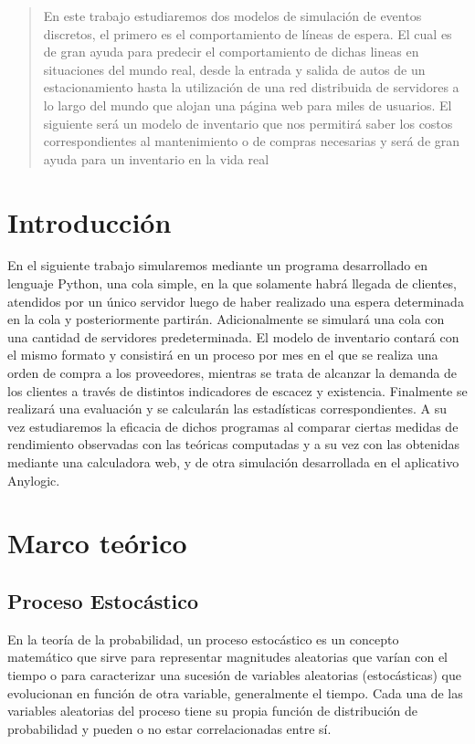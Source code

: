 \begin{abstract}
  En este trabajo estudiaremos dos modelos de simulación de eventos discretos, el primero es el comportamiento
  de líneas de espera. El cual es de gran ayuda para predecir el comportamiento de dichas lineas en
  situaciones del mundo real, desde la entrada y salida de autos de un estacionamiento hasta la utilización
  de una red distribuida de servidores a lo largo del mundo que alojan una página web para miles de usuarios.
  El siguiente será un modelo de inventario que nos permitirá saber los costos correspondientes al mantenimiento
  o de compras necesarias y será de gran ayuda para un inventario en la vida real
\end{abstract}


\section{Introducción}\label{sec:introduccion}
En el siguiente trabajo simularemos mediante un programa desarrollado en lenguaje Python, una cola simple, en la que
solamente habrá llegada de clientes, atendidos por un único servidor luego de haber realizado una espera
determinada en la cola y posteriormente partirán.
Adicionalmente se simulará una cola con una cantidad de servidores predeterminada.
El modelo de inventario contará con el mismo formato y consistirá en un proceso por mes en el que se realiza una orden de compra
a los proveedores, mientras se trata de alcanzar la demanda de los clientes a través de distintos indicadores de escacez y
existencia.
Finalmente se realizará una evaluación y se calcularán las estadísticas correspondientes.
A su vez estudiaremos la eficacia de dichos programas al comparar ciertas medidas de rendimiento observadas con las
teóricas computadas y a su vez con las obtenidas mediante una calculadora web, y de otra simulación desarrollada
en el aplicativo Anylogic.


\section{Marco teórico}\label{sec:marco-teórico}

\subsection{Proceso Estocástico}\label{subsec:proceso-estocástico}
En la teoría de la probabilidad, un proceso estocástico es un concepto matemático que sirve para representar
magnitudes aleatorias que varían con el tiempo o para caracterizar una sucesión de variables aleatorias (estocásticas)
que evolucionan en función de otra variable, generalmente el tiempo.
Cada una de las variables aleatorias del proceso tiene su propia función de distribución de probabilidad y pueden o no
estar correlacionadas entre sí.

